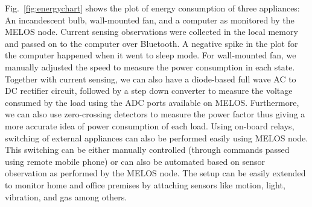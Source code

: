 \documentclass[10pt]{sigplan-proc-varsize}
\newcommand{\figref}[1]{Fig.~\ref{#1}}
\newcommand{\melos}{MELOS }
\newcommand{\melosnospace}{MELOS}
\begin{document}
\figref{fig:energychart} shows the plot of energy consumption of three appliances: An incandescent bulb, wall-mounted fan, and a computer as monitored by the \melos node. Current sensing observations were collected in the local memory and passed on to the computer over Bluetooth. A negative spike in the plot for the computer happened when it went to sleep mode. For wall-mounted fan, we manually adjusted the speed to measure the power consumption in each state. 
Together with current sensing, we can also have a diode-based full wave AC to DC rectifier circuit, followed by a step down converter to measure the voltage consumed by the load using the ADC ports available on \melosnospace. Furthermore, we can also use zero-crossing detectors to measure the power factor thus giving a more accurate idea of power consumption of each load. Using on-board relays, switching of external appliances can also be performed easily using \melos node. This switching can be either manually controlled (through commands passed using remote mobile phone) or can also be automated based on sensor observation as performed by the \melos node. The setup can be easily extended to monitor home and office premises by attaching sensors like motion, light, vibration, and gas among others.
\end{document}
